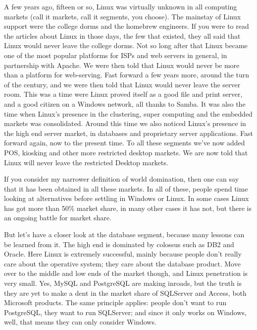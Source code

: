 \documentclass{memoir}
\begin{document}
A few years ago, fifteen or so, Linux was virtually unknown in all
computing markets (call it markets, call it segments, you choose). The
mainstay of Linux support were the college dorms and the homebrew
engineers. If you were to read the articles about Linux in those days,
the few that existed, they all said that Linux would never leave the
college dorms. Not so long after that Linux became one of the most
popular platforms for ISPs and web servers in general, in partnership
with Apache. We were then told that Linux would never be more than a
platform for web-serving. Fast forward a few years more, around the
turn of the century, and we were then told that Linux would never
leave the server room. This was a time were Linux proved itself as a
good file and print server, and a good citizen on a Windows network,
all thanks to Samba. It was also the time when Linux's presence in the
clustering, super computing and the embedded markets was
consolidated. Around this time we also noticed Linux's presence in the
high end server market, in databases and proprietary server
applications. Fast forward again, now to the present time. To all
these segments we've now added POS, kiosking and other more restricted
desktop markets. We are now told that Linux will never leave the
restricted Desktop markets.

If you consider my narrower definition of world domination, then one
can say that it has been obtained in all these markets. In all of
these, people spend time looking at alternatives before settling in
Windows or Linux. In some cases Linux has got more than 50\% market
share, in many other cases it has not, but there is an ongoing battle
for market share.

But let's have a closer look at the database segment, because many
lessons can be learned from it. The high end is dominated by colossus
such as DB2 and Oracle. Here Linux is extremely successful, mainly
because people don't really care about the operative system; they care
about the database product. Move over to the middle and low ends of
the market though, and Linux penetration is very small. Yes, MySQL and
PostgreSQL are making inroads, but the truth is they are yet to make a
dent in the market share of SQLServer and Access, both Microsoft
products. The same principle applies: people don't want to run
PostgreSQL, they want to run SQLServer; and since it only works on
Windows, well, that means they can only consider Windows.
\end{document}
